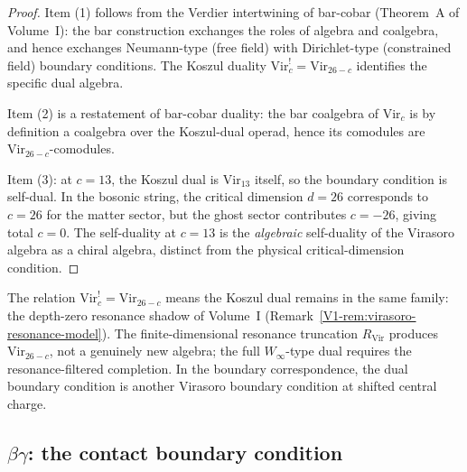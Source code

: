 \begin{proof}
Item (1) follows from the Verdier intertwining of bar-cobar
(Theorem~A of Volume~I): the bar construction exchanges the roles of
algebra and coalgebra, and hence exchanges Neumann-type (free field)
with Dirichlet-type (constrained field) boundary conditions. The
Koszul duality $\mathrm{Vir}_c^! = \mathrm{Vir}_{26-c}$ identifies
the specific dual algebra.

Item (2) is a restatement of bar-cobar duality: the bar coalgebra of
$\mathrm{Vir}_c$ is by definition a coalgebra over the Koszul-dual
operad, hence its comodules are $\mathrm{Vir}_{26-c}$-comodules.

Item (3): at $c = 13$, the Koszul dual is $\mathrm{Vir}_{13}$ itself,
so the boundary condition is self-dual. In the bosonic string, the
critical dimension $d = 26$ corresponds to $c = 26$ for the matter
sector, but the ghost sector contributes $c = -26$, giving total
$c = 0$. The self-duality at $c = 13$ is the \emph{algebraic}
self-duality of the Virasoro algebra as a chiral algebra, distinct from
the physical critical-dimension condition.
\end{proof}

\begin{remark}
The relation $\mathrm{Vir}_c^! = \mathrm{Vir}_{26-c}$ means the
Koszul dual remains in the same family: the
depth-zero resonance shadow of Volume~I
(Remark~\ref*{V1-rem:virasoro-resonance-model}). The
finite-dimensional resonance truncation $R_{\mathrm{Vir}}$ produces
$\mathrm{Vir}_{26-c}$, not a genuinely new algebra; the full
$W_\infty$-type dual requires the resonance-filtered completion.
In the boundary correspondence, the dual boundary
condition is another Virasoro boundary condition at shifted central
charge.
\end{remark}

\subsection{\texorpdfstring{$\beta\gamma$}{Betagamma}: the contact boundary condition}

